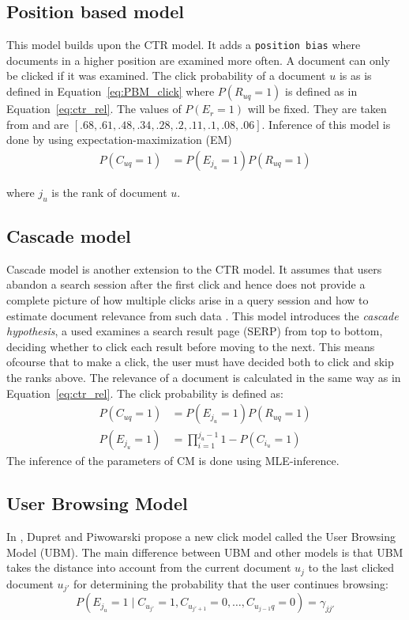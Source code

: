 \subsection{Position based model}
This model builds upon the CTR model. It adds a \texttt{position bias} where documents in a higher position are examined more often. A document can only be clicked if it was examined. The click probability of a document $u$ is as is defined in Equation~\ref{eq:PBM_click} where $P(R_{uq}=1)$ is defined as in Equation~\ref{eq:ctr_rel}. The values of $P(E_r=1)$ will be fixed. They are taken from \cite{eye_track} and are $[.68, .61, .48, .34, .28, .2, .11, .1, .08, .06]$. Inference of this model is done by using expectation-maximization (EM)
\begin{align}
	P(C_{uq}=1) &= P(E_{j_u}=1)P(R_{uq}=1) \label{eq:PBM_click}
\end{align}

where $j_u$ is the rank of document $u$.

\subsection{Cascade model}
Cascade model is another extension to the CTR model. It assumes that users abandon a search session after the first click and hence does not provide a complete picture of how multiple clicks arise in a query session and how to estimate document relevance from such data \cite{Kempe2008, Craswell2008}. This model introduces the \textit{cascade hypothesis}, a used examines a search result page (SERP) from top to bottom, deciding whether to click each result before moving to the next. This means ofcourse that to make a click, the user must have decided both to click and skip the ranks above. The relevance of a document is calculated in the same way as in Equation~\ref{eq:ctr_rel}. The click probability is defined as:
\begin{align}
	P(C_{uq}=1) &= P(E_{j_u}=1)P(R_{uq}=1) \label{eq:CM_click} \\
	P(E_{j_u}=1) &= \prod_{i=1}^{j_u-1} 1 - P(C_{i_u}=1) \nonumber
\end{align}
The inference of the parameters of CM is done using MLE-inference.

\subsection{User Browsing Model}
In \cite{Dupret2008}, Dupret and Piwowarski propose a new click model called the User Browsing Model (UBM). The main difference between UBM and other models is that UBM takes the distance into account from the current document \(u_j\) to the last clicked document \(u_{j'}\) for determining the probability that the user continues browsing:
\[P(E_{j_u} = 1 \mid C_{u_{j'}}=1, C_{u_{j'+1}}=0, \dots, C_{u_{j-1}q}=0) = \gamma_{jj'}\]

